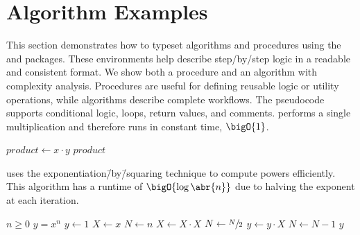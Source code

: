 \section{Algorithm Examples}

This section demonstrates how to typeset algorithms and procedures using the  and  packages. These environments help describe step\-/by\-/step logic in a readable and consistent format. We show both a procedure and an algorithm with complexity analysis. Procedures are useful for defining reusable logic or utility operations, while algorithms describe complete workflows. The pseudocode supports conditional logic, loops, return values, and comments.  performs a single multiplication and therefore runs in constant time, $\bigO{1}$.

\begin{procedure}
  \caption{Multiply two integers.}
  \begin{algorithmic}[1]
      \State $product \gets x \cdot y$
      \State \Return $product$
    \EndProcedure
  \end{algorithmic}
  \label{pro:mult}
\end{procedure}

 uses the exponentiation\=/by\=/squaring technique to compute powers efficiently. This algorithm has a runtime of $\bigO{\log\abr{n}}$ due to halving the exponent at each iteration.

\begin{algorithm}
  \caption{Exponentiation by squaring.}
  \label{alg:expBySquaring}
  \begin{algorithmic}[1]
      \Require $n ≥ 0$
      \Ensure $y = x^n$
      \State $y \gets 1$
      \State $X \gets x$
      \State $N \gets n$
          \State $X \gets X \cdot X$
          \State $N \gets \sfrac{N}{2}$ 
        \Else
          \State $y \gets y \cdot X$
          \State $N \gets N - 1$
        \EndIf
      \EndWhile
      \State \Return $y$
    \EndFunction
  \end{algorithmic}
\end{algorithm}
